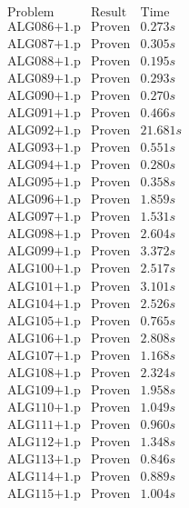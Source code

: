 \documentclass[a4paper,11pt]{report}
\theoremstyle{definition}
\theoremstyle{definition}
\theoremstyle{definition}
\theoremstyle{definition}
\theoremstyle{definition}
\theoremstyle{definition}
\theoremstyle{definition}
\begin{document}
	\pagebreak
	
	\begin{minipage}{0.45\textwidth}
		\[\begin{matrix}
			\text{Problem}&\text{Result}&\text{Time}\\
			\text{ALG086+1.p}&\text{Proven}& 0.273 s\\
			\text{ALG087+1.p}&\text{Proven}& 0.305 s\\
			\text{ALG088+1.p}&\text{Proven}& 0.195 s\\
			\text{ALG089+1.p}&\text{Proven}& 0.293 s\\
			\text{ALG090+1.p}&\text{Proven}& 0.270 s\\
			\text{ALG091+1.p}&\text{Proven}& 0.466 s\\
			\text{ALG092+1.p}&\text{Proven}& 21.681 s\\
			\text{ALG093+1.p}&\text{Proven}& 0.551 s\\
			\text{ALG094+1.p}&\text{Proven}& 0.280 s\\
			\text{ALG095+1.p}&\text{Proven}& 0.358 s\\
			\text{ALG096+1.p}&\text{Proven}& 1.859 s\\
			\text{ALG097+1.p}&\text{Proven}& 1.531 s\\
			\text{ALG098+1.p}&\text{Proven}& 2.604 s\\
			\text{ALG099+1.p}&\text{Proven}& 3.372 s\\
			\text{ALG100+1.p}&\text{Proven}& 2.517 s\\
			\text{ALG101+1.p}&\text{Proven}& 3.101 s\\
			\text{ALG104+1.p}&\text{Proven}& 2.526 s\\
			\text{ALG105+1.p}&\text{Proven}& 0.765 s\\
			\text{ALG106+1.p}&\text{Proven}& 2.808 s\\
			\text{ALG107+1.p}&\text{Proven}& 1.168 s\\
			\text{ALG108+1.p}&\text{Proven}& 2.324 s\\
			\text{ALG109+1.p}&\text{Proven}& 1.958 s\\
			\text{ALG110+1.p}&\text{Proven}& 1.049 s\\
			\text{ALG111+1.p}&\text{Proven}& 0.960 s\\
			\text{ALG112+1.p}&\text{Proven}& 1.348 s\\
			\text{ALG113+1.p}&\text{Proven}& 0.846 s\\
			\text{ALG114+1.p}&\text{Proven}& 0.889 s\\
			\text{ALG115+1.p}&\text{Proven}& 1.004 s\\

\end{matrix}\]
\end{minipage}
\end{document}
